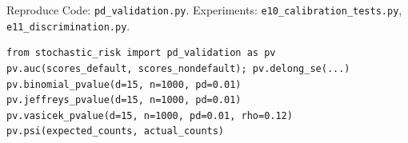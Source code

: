 \documentclass[aspectratio=169,10pt]{beamer}
\begin{document}
\begin{frame}[fragile]{Reproduce}
  \small
  Code: \texttt{pd\_validation.py}. Experiments: \texttt{e10\_calibration\_tests.py}, \texttt{e11\_discrimination.py}.
\begin{verbatim}
from stochastic_risk import pd_validation as pv
pv.auc(scores_default, scores_nondefault); pv.delong_se(...)
pv.binomial_pvalue(d=15, n=1000, pd=0.01)
pv.jeffreys_pvalue(d=15, n=1000, pd=0.01)
pv.vasicek_pvalue(d=15, n=1000, pd=0.01, rho=0.12)
pv.psi(expected_counts, actual_counts)
\end{verbatim}
\end{frame}

\deckreferences
\end{document}
